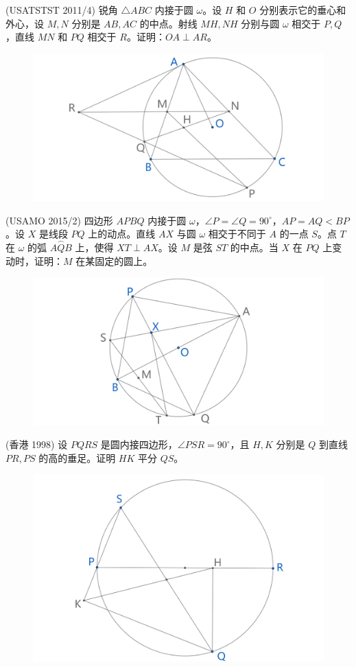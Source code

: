 \newpage 
\begin{exercise}
    (USATSTST 2011/4) 锐角 $\triangle ABC$ 内接于圆 $\omega$。设 $H$ 和 $O$ 分别表示它的垂心和外心，设 $M, N$ 分别是 $AB, AC$ 的中点。射线 $MH, NH$ 分别与圆 $\omega$ 相交于 $P, Q$，直线 $MN$ 和 $PQ$ 相交于 $R$。证明：$OA \perp AR$。
\end{exercise}
\begin{figure}[H]
    \centering
    \includegraphics[width=0.7\linewidth]{figures/exercises/329.png}
\end{figure}

\begin{exercise}
    (USAMO 2015/2) 四边形 $APBQ$ 内接于圆 $\omega$，$\angle P = \angle Q = 90^\circ$，$AP = AQ < BP$。设 $X$ 是线段 ${PQ}$ 上的动点。直线 $AX$ 与圆 $\omega$ 相交于不同于 $A$ 的一点 $S$。点 $T$ 在 $\omega$ 的弧 $\overset{\frown}{AQB}$ 上，使得 $XT \perp AX$。设 $M$ 是弦 ${ST}$ 的中点。当 $X$ 在 ${PQ}$ 上变动时，证明：$M$ 在某固定的圆上。
\end{exercise}
\begin{figure}[H]
    \centering
    \includegraphics[width=0.7\linewidth]{figures/exercises/330.png}
\end{figure}


\newpage 
\begin{exercise}
    (香港 1998) 设 $PQRS$ 是圆内接四边形，$\angle PSR = 90^\circ$，且 $H, K$ 分别是 $Q$ 到直线 $PR, PS$ 的高的垂足。证明 $HK$ 平分 $QS$。
\end{exercise}
\begin{figure}[H]
    \centering
    \includegraphics[width=0.7\linewidth]{figures/exercises/441.png}
\end{figure}


